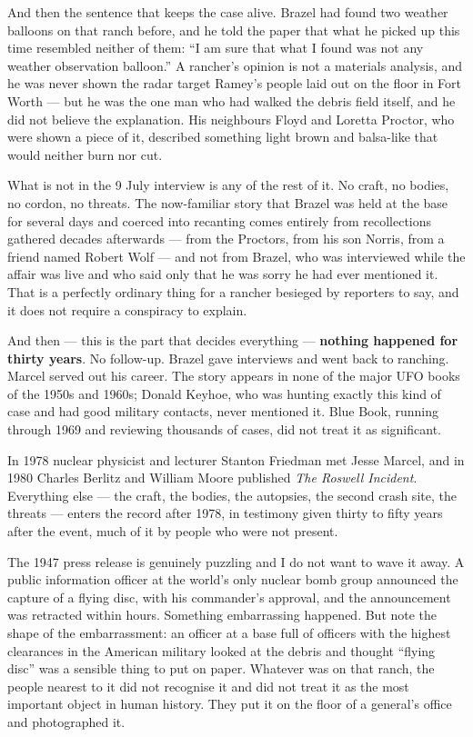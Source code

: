 And then the sentence that keeps the case alive. Brazel had found two weather balloons on that ranch
before, and he told the paper that what he picked up this time resembled neither of them: ``I am sure
that what I found was not any weather observation balloon.'' A rancher's opinion is not a materials
analysis, and he was never shown the radar target Ramey's people laid out on the floor in Fort Worth
--- but he was the one man who had walked the debris field itself, and he did not believe the
explanation. His neighbours Floyd and Loretta Proctor, who were shown a piece of it, described
something light brown and balsa-like that would neither burn nor cut.

What is not in the 9 July interview is any of the rest of it. No craft, no bodies, no cordon, no
threats. The now-familiar story that Brazel was held at the base for several days and coerced into
recanting comes entirely from recollections gathered decades afterwards --- from the Proctors, from
his son Norris, from a friend named Robert Wolf --- and not from Brazel, who was interviewed while
the affair was live and who said only that he was sorry he had ever mentioned it. That is a
perfectly ordinary thing for a rancher besieged by reporters to say, and it does not require a
conspiracy to explain.

And then --- this is the part that decides everything --- \textbf{nothing happened for thirty
years}. No follow-up. Brazel gave interviews and went back to ranching. Marcel served out his
career. The story appears in none of the major UFO books of the 1950s and 1960s; Donald Keyhoe,
who was hunting exactly this kind of case and had good military contacts, never mentioned it.
Blue Book, running through 1969 and reviewing thousands of cases, did not treat it as significant.

In 1978 nuclear physicist and lecturer Stanton Friedman met Jesse Marcel, and in 1980 Charles
Berlitz and William Moore published \emph{The Roswell Incident}. Everything else --- the craft, the
bodies, the autopsies, the second crash site, the threats --- enters the record after 1978, in
testimony given thirty to fifty years after the event, much of it by people who were not present.

\begin{funfact}
The 1947 press release is genuinely puzzling and I do not want to wave it away. A public
information officer at the world's only nuclear bomb group announced the capture of a flying disc,
with his commander's approval, and the announcement was retracted within hours. Something
embarrassing happened. But note the shape of the embarrassment: an officer at a base full of
officers with the highest clearances in the American military looked at the debris and thought
``flying disc'' was a sensible thing to put on paper. Whatever was on that ranch, the people
nearest to it did not recognise it and did not treat it as the most important object in human
history. They put it on the floor of a general's office and photographed it.
\end{funfact}

